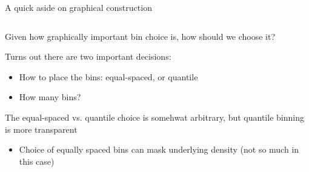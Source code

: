\documentclass[notes,11pt, aspectratio=169]{beamer}
\newenvironment{wideitemize}{\itemize\addtolength{\itemsep}{10pt}}{\enditemize}
\begin{document}
\begin{frame}{A quick aside on graphical construction}
  \begin{columns}[onlytextwidth, T] %
    \begin{column}{.5\textwidth}
      \begin{wideitemize}
      \item Given how graphically important bin choice is, how should
        we choose it?
      \item Turns out there are two important decisions:
        \begin{itemize}
        \item How to place the bins: equal-spaced, or quantile
        \item How many bins?
        \end{itemize}
      \item The equal-spaced vs. quantile choice is somehwat
        arbitrary, but quantile binning is more transparent
        \begin{itemize}
        \item Choice of equally spaced bins can mask underlying
          density (not so much in this case)
        \end{itemize}


\end{wideitemize}
\end{column}
\end{columns}
\end{frame}
\end{document}
